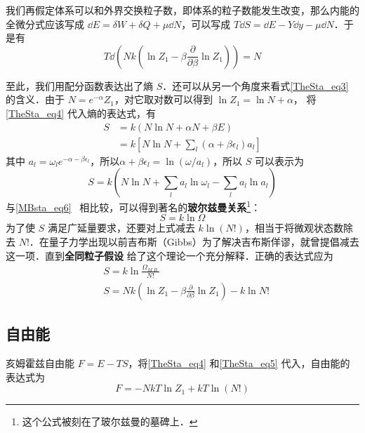 我们再假定体系可以和外界交换粒子数，即体系的粒子数能发生改变，那么内能的全微分式应该写成 $\dd E=\delta W+\delta Q+\mu\dd N$，可以写成 $T\dd S=\dd E-Y\dd y-\mu\dd N$．于是有
\begin{equation}
T\dd(Nk(\ln Z_1-\beta\frac{\partial }{\partial \beta}\ln Z_1))=N
\end{equation}



至此，我们用配分函数表达出了熵 $S$．还可以从另一个角度来看式\autoref{TheSta_eq3} 的含义．由于 $N=e^{-\alpha}Z_1$，对它取对数可以得到 $\ln Z_1=\ln N+\alpha$，
将\autoref{TheSta_eq4} 代入熵的表达式，有
\begin{equation}
\begin{aligned}
S&=k(N\ln N+\alpha N+\beta E)
\\&=k[N\ln N+\sum_l(\alpha+\beta\epsilon_l)a_l]
\end{aligned}
\end{equation}
其中 $a_l=\omega_le^{-\alpha-\beta\epsilon_l}$，所以$\alpha+\beta\epsilon_l=\ln(\omega/a_l)$，所以 $S$ 可以表示为
\begin{equation}
S=k(N\ln N+\sum_l a_l\ln\omega_l-\sum_l a_l\ln a_l)
\end{equation}
与\autoref{MBsta_eq6}~ 相比较，可以得到著名的\textbf{玻尔兹曼关系}\footnote{这个公式被刻在了玻尔兹曼的墓碑上．}：
\begin{equation}
S=k\ln \Omega
\end{equation}
为了使 $S$ 满足广延量要求，还要对上式减去 $k\ln (N!)$，相当于将微观状态数除去 $N!$．在量子力学出现以前吉布斯（Gibbs）为了解决吉布斯佯谬，就曾提倡减去这一项．直到\textbf{全同粒子假设} 给了这个理论一个充分解释．正确的表达式应为
\begin{equation}\label{TheSta_eq5}
\begin{aligned}
&S=k\ln \frac{\Omega_{M.B.}}{N!}\\
&S=Nk(\ln Z_1-\beta\frac{\partial }{\partial \beta}\ln Z_1)-k\ln N!
\end{aligned}
\end{equation}
\subsection{自由能}
亥姆霍兹自由能 $F=E-TS$，将\autoref{TheSta_eq4} 和\autoref{TheSta_eq5} 代入，自由能的表达式为
\begin{equation}
F=-NkT\ln Z_1+kT\ln(N!)
\end{equation}
